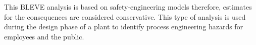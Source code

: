 \documentclass[10pt,parskip=half,
toc=sectionentrywithdots,
bibliography=totocnumbered,
captions=tableheading,numbers=noendperiod]{scrartcl}
\begin{document}
This BLEVE analysis is based on safety-engineering models therefore,
estimates for the consequences are considered conservative. This type of
analysis is used during the design phase of a plant to identify process
engineering hazards for employees and the public.



\end{document}
